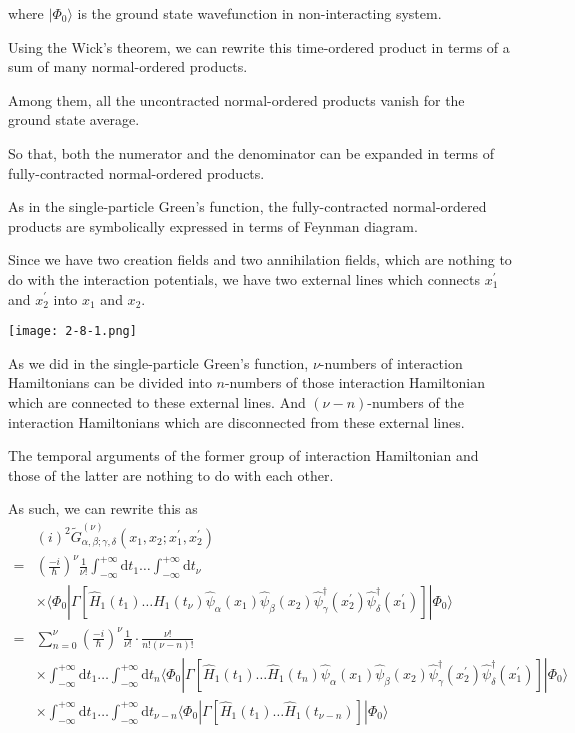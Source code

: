 where $| \Phi_0 \rangle$ is the ground state wavefunction in non-interacting system.

Using the Wick's theorem, we can rewrite this time-ordered product in terms of a sum of many normal-ordered products.

Among them, all the uncontracted normal-ordered products vanish for the ground state average.

So that, both the numerator and the denominator can be expanded in terms of fully-contracted normal-ordered products.

As in the single-particle Green's function, the fully-contracted normal-ordered products are symbolically expressed in terms of Feynman diagram.

Since we have two creation fields and two annihilation fields, which are nothing to do with the interaction potentials, we have two external lines which connects $x_1^{'}$ and $x_2^{'}$ into $x_1$ and $x_2$.
\begin{center} \label{Fig2.8.1}
\texttt{[image: 2-8-1.png]}
\end{center}

As we did in the single-particle Green's function, $\nu$-numbers of interaction Hamiltonians can be divided into $n$-numbers of those interaction Hamiltonian which are connected to these external lines. And $(\nu-n)$-numbers of the interaction Hamiltonians which are disconnected from these external lines.

The temporal arguments of the former group of interaction Hamiltonian and those of the latter are nothing to do with each other.

As such, we can rewrite this as
\[ \begin{split} &(i)^2\tilde{G}^{(\nu)}_{\alpha,\beta;\gamma,\delta}(x_1,x_2;x_1^{'},x_2^{'})\\
 =& \left( \frac{-i}{\hbar} \right)^\nu \frac{1}{\nu!} \int_{-\infty}^{+\infty}\mathrm{d}t_1 \ldots \int_{-\infty}^{+\infty}\mathrm{d}t_\nu \\
&\times \langle \Phi_0 | \Gamma[\hat{H}_1(t_1)\ldots\hat{H}_1(t_\nu)\hat{\psi}_\alpha(x_1) \hat{\psi}_\beta(x_2) \hat{\psi}_\gamma^\dagger(x_2^{'}) \hat{\psi}_\delta^\dagger(x_1^{'})]|\Phi_0\rangle\\
=& \sum_{n=0}^{\nu}\left( \frac{-i}{\hbar} \right)^\nu \frac{1}{\nu!}\cdot\frac{\nu!}{n!(\nu-n)!}\\
&\times\int_{-\infty}^{+\infty}\mathrm{d}t_1 \ldots \int_{-\infty}^{+\infty}\mathrm{d}t_n
\langle \Phi_0 | \Gamma[\hat{H}_1(t_1)\ldots\hat{H}_1(t_n)\hat{\psi}_\alpha(x_1) \hat{\psi}_\beta(x_2) \hat{\psi}_\gamma^\dagger(x_2^{'}) \hat{\psi}_\delta^\dagger(x_1^{'})]|\Phi_0\rangle\\
&\times\int_{-\infty}^{+\infty}\mathrm{d}t_1 \ldots \int_{-\infty}^{+\infty}\mathrm{d}t_{\nu-n}
\langle \Phi_0 | \Gamma[\hat{H}_1(t_1)\ldots\hat{H}_1(t_{\nu-n})]|\Phi_0\rangle
\end{split} \]

